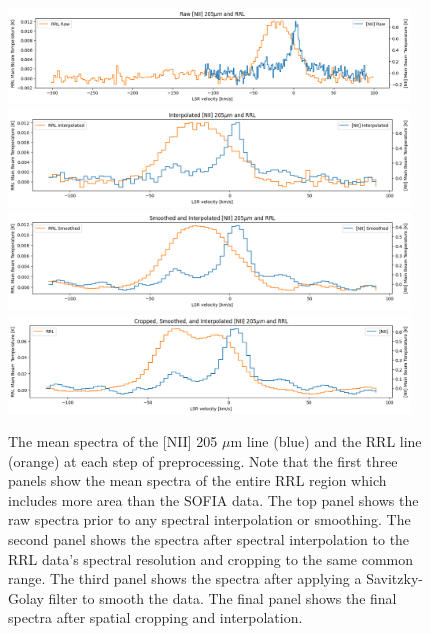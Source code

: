\begin{figure}
    \centering
    \includegraphics[width=0.95\textwidth]{figs/carina/spec_raw.png}
    \includegraphics[width=0.95\textwidth]{figs/carina/spec_inter.png}
    \includegraphics[width=0.95\textwidth]{figs/carina/spec_smooth.png}    
    \includegraphics[width=0.95\textwidth]{figs/carina/spec_final.png}
    \caption[Mean Spectra of {[}NII{]} 205 $\mu$m and RRL Data During Preprocessing]{
        The mean spectra of the [NII] 205 $\mu$m line (blue) and the RRL line (orange) at each step of preprocessing.
        Note that the first three panels show the mean spectra of the entire RRL region which includes more area than the SOFIA data.
        The top panel shows the raw spectra prior to any spectral interpolation or smoothing.
        The second panel shows the spectra after spectral interpolation to the RRL data's spectral resolution and cropping to the same common range.
        The third panel shows the spectra after applying a Savitzky-Golay filter to smooth the data.
        The final panel shows the final spectra after spatial cropping and interpolation.
        }
    \label{carina/fig:spectral_means}
\end{figure}

